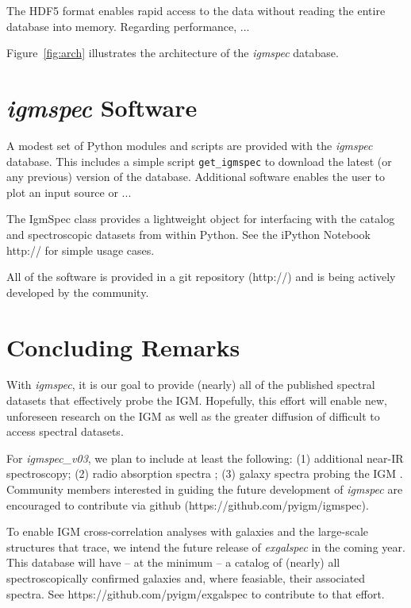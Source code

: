 \documentclass[12pt,preprint]{aastex}
\begin{document}
The HDF5 format enables rapid access to the data without
reading the entire database into memory.  Regarding
performance, ...

Figure~\ref{fig:arch} illustrates the 
architecture of the {\it igmspec} database.


\section{{\it igmspec} Software}
\label{sec:software}

A modest set of Python modules and scripts are provided
with the {\it igmspec} database.  This includes a simple
script {\tt get\_igmspec} to download the latest
(or any previous) version of the database.
Additional software enables the user to plot an
input source or ...

The IgmSpec class provides a lightweight object for
interfacing with the catalog and spectroscopic datasets
from within Python.  See the iPython Notebook
http:// for simple usage cases.

All of the software is provided in a git repository
(http://)
and is being actively developed by the community.

\section{Concluding Remarks}
\label{sec:end}

With {\it igmspec}, it is our goal to provide (nearly)
all of the published spectral datasets that effectively
probe the IGM.  Hopefully, this effort will
enable new, unforeseen research on the IGM as well
as the greater diffusion of difficult to access spectral
datasets.  

For {\it igmspec\_v03}, we plan to include at least the following:
(1) additional near-IR spectroscopy;
(2) radio absorption spectra \citep[e.g. 21\,cm][]{kanekar1X};
(3) galaxy spectra probing the IGM \citep[e.g.][]{rubin+16}.
Community members interested in guiding the future development
of {\it igmspec} are encouraged to contribute via github
(https://github.com/pyigm/igmspec).

To enable IGM cross-correlation analyses with galaxies
and the large-scale structures that trace,
we intend the future release of {\it exgalspec}
in the coming year.  This database will have -- at
the minimum -- a catalog of (nearly) all spectroscopically
confirmed galaxies and, where feasiable, their associated
spectra.  See https://github.com/pyigm/exgalspec
to contribute to that effort.
\end{document}
